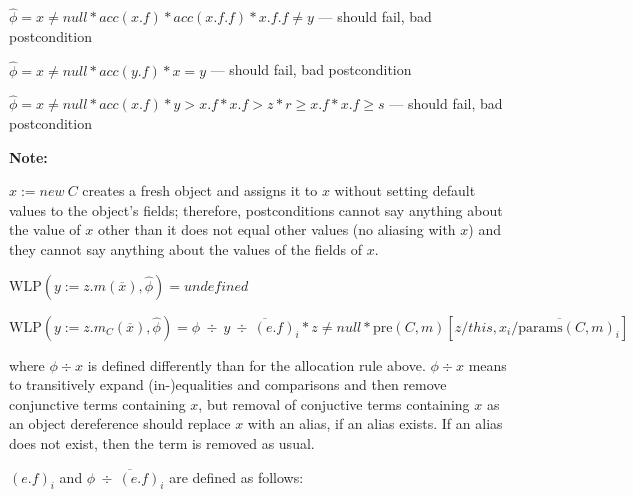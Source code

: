 \documentclass {article}
\newcommand{\fphi}{\widehat{\phi}}
\newcommand{\wlp}[2]{\text{WLP}(#1,#2)}
\begin{document}
$\fphi = x \neq null \ast acc(x.f) \ast acc(x.f.f) \ast x.f.f \neq y$ --- should fail, bad postcondition

$\fphi = x \neq null \ast acc(y.f) \ast x = y$ --- should fail, bad postcondition

$\fphi = x \neq null \ast acc(x.f) \ast y > x.f \ast x.f > z \ast r \geq x.f \ast x.f \geq s$ --- should fail, bad postcondition


\textbf{Note:}

$x := new \ C$ creates a fresh object and assigns it to $x$ without setting default values to the object's fields; therefore, postconditions cannot say anything about the value of $x$ other than it does not equal other values (no aliasing with $x$) and they cannot say anything about the values of the fields of $x$.

\vspace{0.5cm}

$\wlp{y := z.m(\overline{x})}{\fphi} = undefined$

\vspace{0.5cm}

$\wlp{y := z.m_C(\overline{x})}{\fphi} = \fphi \ \div \ y \overline{\ \div \ (e.f)_i} \ast z \neq null \ast \text{pre}(C,m)\left[z/this, \overline{x_i/\text{params}(C,m)_i}\right]$


where $\phi \div x$ is defined differently than for the allocation rule above. $\phi \div x$ means to transitively expand (in-)equalities and comparisons and then remove conjunctive terms containing $x$, but removal of conjuctive terms containing $x$ as an object dereference should replace $x$ with an alias, if an alias exists. If an alias does not exist, then the term is removed as usual.

$(e.f)_i$ and $\phi \overline{\ \div \ (e.f)_i}$ are defined as follows:
\end{document}

